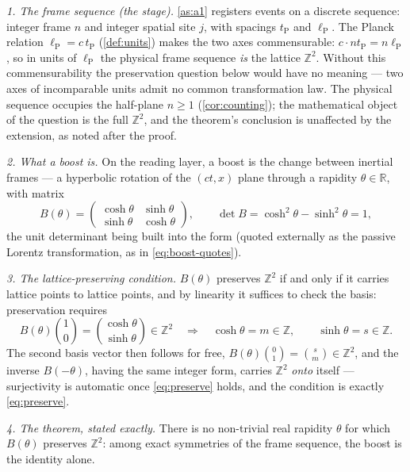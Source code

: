 \documentclass[11pt]{amsbook}
\theoremstyle{plain}
\theoremstyle{definition}
\theoremstyle{remark}
\begin{document}
\emph{1. The frame sequence (the stage).} \cref{as:a1} registers events on a discrete sequence: integer frame $n$ and integer spatial site $j$, with spacings $t_{\mathrm P}$ and $\ell_{\mathrm P}$. The Planck relation $\ell_{\mathrm P} = c\,t_{\mathrm P}$ (\cref{def:units}) makes the two axes commensurable: $c\cdot n t_{\mathrm P} = n\ell_{\mathrm P}$, so in units of $\ell_{\mathrm P}$ the physical frame sequence \emph{is} the lattice $\mathbb{Z}^{2}$. Without this commensurability the preservation question below would have no meaning --- two axes of incomparable units admit no common transformation law. The physical sequence occupies the half-plane $n \geq 1$ (\cref{cor:counting}); the mathematical object of the question is the full $\mathbb{Z}^{2}$, and the theorem's conclusion is unaffected by the extension, as noted after the proof.

\emph{2. What a boost is.} On the reading layer, a boost is the change between inertial frames --- a hyperbolic rotation of the $(ct, x)$ plane through a rapidity $\theta \in \mathbb{R}$, with matrix
\begin{equation}\label{eq:boostmatrix}
B(\theta) = \begin{pmatrix} \cosh\theta & \sinh\theta \\ \sinh\theta & \cosh\theta \end{pmatrix},
\qquad \det B = \cosh^{2}\theta - \sinh^{2}\theta = 1,
\end{equation}
the unit determinant being built into the form (quoted externally as the passive Lorentz transformation, as in \cref{eq:boost-quotes}).

\emph{3. The lattice-preserving condition.} $B(\theta)$ preserves $\mathbb{Z}^{2}$ if and only if it carries lattice points to lattice points, and by linearity it suffices to check the basis: preservation requires
\begin{equation}\label{eq:preserve}
B(\theta)\binom{1}{0} = \binom{\cosh\theta}{\sinh\theta} \in \mathbb{Z}^{2}
\quad\Longrightarrow\quad
\cosh\theta = m \in \mathbb{Z},\qquad \sinh\theta = s \in \mathbb{Z}.
\end{equation}
The second basis vector then follows for free, $B(\theta)\binom{0}{1} = \binom{s}{m} \in \mathbb{Z}^{2}$, and the inverse $B(-\theta)$, having the same integer form, carries $\mathbb{Z}^{2}$ \emph{onto} itself --- surjectivity is automatic once \cref{eq:preserve} holds, and the condition is exactly \cref{eq:preserve}.

\emph{4. The theorem, stated exactly.} There is no non-trivial real rapidity $\theta$ for which $B(\theta)$ preserves $\mathbb{Z}^{2}$: among exact symmetries of the frame sequence, the boost is the identity alone.
\end{document}
